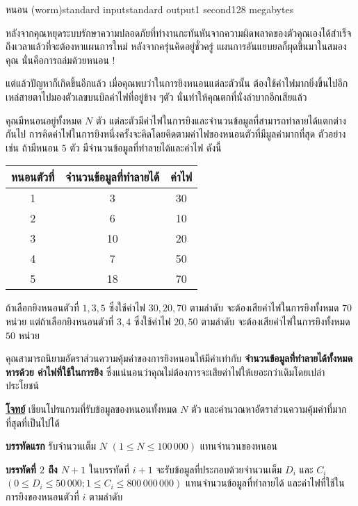 \documentclass[11pt,a4paper]{article}
\begin{document}
\begin{problem}{หนอน (worm)}{standard input}{standard output}{1 second}{128 megabytes}

 หลังจากคุณหยุดระบบรักษาความปลอดภัยที่ทำงานกะทันหันจากความผิดพลาดของตัวคุณเองได้สำเร็จ ถึงเวลาแล้วที่จะต้องหาแผนการใหม่ หลังจากครุ่นคิดอยู่ชั่วครู่ แผนการอันแยบยลก็ผุดขึ้นมาในสมองคุณ นั่นคือการถล่มด้วยหนอน !

            แต่แล้วปัญหาก็เกิดขึ้นอีกแล้ว เมื่อคุณพบว่าในการยิงหนอนแต่ละตัวนั้น ต้องใช้ค่าไฟมากยิ่งขึ้นไปอีก เหล่สายตาไปมองตัวเลขบนบิลค่าไฟที่อยู่ข้าง ๆตัว นั่นทำให้คุณตกที่นั่งลำบากอีกเสียแล้ว

            คุณมีหนอนอยู่ทั้งหมด $N$ ตัว แต่ละตัวมีค่าไฟในการยิงและจำนวนข้อมูลที่สามารถทำลายได้แตกต่างกันไป การคิดค่าไฟในการยิงหนึ่งครั้งจะคิดโดยคิดตามค่าไฟของหนอนตัวที่มีมูลค่ามากที่สุด ตัวอย่างเช่น ถ้ามีหนอน $5$ ตัว มีจำนวนข้อมูลที่ทำลายได้และค่าไฟ ดังนี้
            
\begin{center}
\begin{tabular}{|c|c|c|}
\hline
หนอนตัวที่& จำนวนข้อมูลที่ทำลายได้& ค่าไฟ\\
\hline
1&3&30\\
\hline
2&6&10\\
\hline
3&10&20\\
\hline
4&7&50\\
\hline
5&18&70\\
\hline
\end{tabular}
\end{center}

ถ้าเลือกยิงหนอนตัวที่ $1, 3, 5$ ซึ่งใช้ค่าไฟ $30, 20, 70$ ตามลำดับ จะต้องเสียค่าไฟในการยิงทั้งหมด $70$ หน่วย แต่ถ้าเลือกยิงหนอนตัวที่ $3, 4$ ซึ่งใช้ค่าไฟ $20, 50$ ตามลำดับ จะต้องเสียค่าไฟในการยิงทั้งหมด $50$ หน่วย

คุณสามารถนิยามอัตราส่วนความคุ้มค่าของการยิงหนอนให้มีค่าเท่ากับ\textbf{ จำนวนข้อมูลที่ทำลายได้ทั้งหมด หารด้วย ค่าไฟที่ใช้ในการยิง} ซึ่งแน่นอนว่าคุณไม่ต้องการจะเสียค่าไฟให้เยอะกว่าเดิมโดยเปล่าประโยชน์

\bigskip
\underline{\textbf{โจทย์}}  เขียนโปรแกรมที่รับข้อมูลของหนอนทั้งหมด $N$ ตัว และคำนวณหาอัตราส่วนความคุ้มค่าที่มากที่สุดที่เป็นไปได้

\InputFile

\textbf{บรรทัดแรก} รับจำนวนเต็ม $N$ $(1 \leq N \leq 100\,000)$ แทนจำนวนของหนอน

\textbf{บรรทัดที่ $2$ ถึง $N + 1$} ในบรรทัดที่ $i+1$ จะรับข้อมูลที่ประกอบด้วยจำนวนเต็ม $D_i$ และ $C_i$ $(0 \leq D_i \leq 50\,000; 1 \leq C_i \leq 800\,000\,000)$ แทนจำนวนข้อมูลที่ทำลายได้ และค่าไฟที่ใช้ในการยิงของหนอนตัวที่ $i$ ตามลำดับ



\end{problem}
\end{document}

